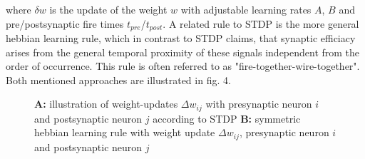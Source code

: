 \documentclass[letterpaper, 10 pt, conference]{ieeeconf}  %
\begin{document}
where $\delta w$ is the update of the weight $w$ with adjustable learning rates $A$, $B$ and pre/postsynaptic fire times $t_{pre}$/$t_{post}$. A 
related rule to STDP is the more general hebbian learning rule, which in contrast to STDP claims, that synaptic efficiacy arises from the 
general temporal proximity of these signals independent from the order of occurrence. This rule is often referred to as "fire-together-wire-together".
Both mentioned approaches are illustrated in fig. 4.

\begin{figure}[thpb]
        \centering
  \caption{\textbf{A: } illustration of weight-updates $\Delta w_{ij}$ with presynaptic neuron $i$ and postsynaptic neuron $j$ according to STDP \newline 
  \textbf{B: } symmetric hebbian learning rule with weight update $\Delta w_{ij}$, presynaptic neuron $i$ and postsynaptic neuron $j$}
        \label{figurelabel}
\end{figure}
\end{document}
